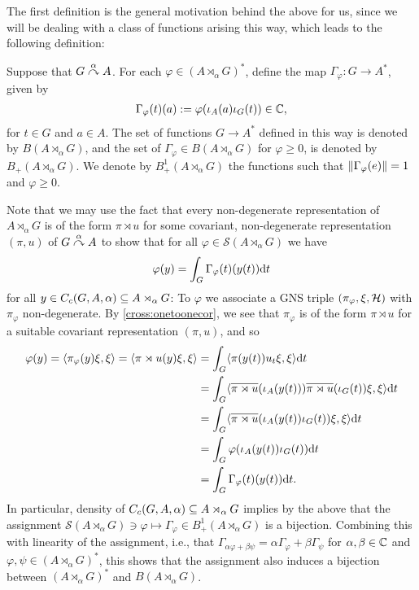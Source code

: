 The first definition is the general motivation behind the above for us, since we will be dealing with a class of functions arising this way, which leads to the following definition:
\begin{definition}
	Suppose that $G \stackrel{\alpha}{\curvearrowright} A$. For each $\varphi \in (A \rtimes_\alpha G)^*$, define the map $\Gamma_\varphi \colon G \to A^*$, given by
	\begin{align*}
		\Gamma_\varphi(t)(a) :=\varphi(\iota_A(a) \iota_G(t)) \in \mathbb{C},
	\end{align*}
	for $t \in G $ and $a \in A$. The set of functions $G \to A^*$ defined in this way is denoted by $B(A \rtimes_ \alpha G)$, and the set of $\Gamma_\varphi \in B(A \rtimes_ \alpha G)$ for $\varphi \geq 0$,  is denoted by $B_+(A \rtimes_\alpha G)$. We denote by $B_+^1(A \rtimes_\alpha G)$ the functions such that $\left\lVert \Gamma_\varphi (e) \right\rVert = 1$ and $\varphi \geq 0$. 
\end{definition}
\begin{remark}
	Note that we may use the fact that every non-degenerate representation of $A \rtimes_\alpha G$ is of the form $\pi \rtimes u$ for some covariant, non-degenerate representation $(\pi,u)$ of $G \stackrel{\alpha}{\curvearrowright} A$ to show that for all $\varphi \in \mathcal{S}(A \rtimes_\alpha G)$ we have
	\begin{align}
		\varphi(y) = \int_G \Gamma_\varphi(t)(y(t)) \mathrm{d} t
		\label{eq:gammafun}
	\end{align}
	for all $y \in C_c(G,A,\alpha) \subseteq A \rtimes_\alpha G$: To $\varphi$ we associate a GNS triple $(\pi_\varphi,\xi, \mathcal{H})$ with $\pi_{\varphi}$ non-degenerate. By \cref{cross:onetoonecor}, we see that $\pi_\varphi$ is of the form $\pi \rtimes u$ for a suitable covariant representation $(\pi,u)$, and so
	\begin{align*}
	\varphi(y) = \langle \pi_\varphi(y) \xi, \xi \rangle = \langle \pi \rtimes u(y) \xi, \xi\rangle &= \int_G \langle \pi(y(t)) u_t \xi, \xi \rangle \mathrm{d} t\\
	&= \int_G \langle \overline{\pi \rtimes u }(\iota_A(y(t))) \overline{\pi \rtimes u } (\iota_G(t)) \xi , \xi \rangle \mathrm{d} t\\
	&= \int_G \langle \overline{\pi \rtimes u} (\iota_A(y(t)) \iota_G(t)) \xi , \xi \rangle\mathrm{d} t\\
	&= \int_G \varphi(\iota_A(y(t)) \iota_G(t)) \mathrm{d} t \\
	&= \int_G \Gamma_\varphi (t) (y(t)) \mathrm{d} t.
	\end{align*}
	In particular, density of $C_c(G, A,\alpha) \subseteq A \rtimes_\alpha G$ implies by the above that the assignment $\mathcal{S}(A \rtimes_\alpha G) \ni \varphi \mapsto \Gamma_\varphi \in B_+^1(A \rtimes_\alpha G)$ is a bijection. Combining this with linearity of the assignment, i.e., that $\Gamma_{\alpha \varphi + \beta \psi}= \alpha \Gamma_\varphi + \beta \Gamma_\psi$ for $\alpha, \beta \in \mathbb{C}$ and $\varphi, \psi \in (A \rtimes_\alpha G)^*$, this shows that the assignment also induces a bijection between $(A \rtimes_\alpha G )^*$ and $B(A \rtimes_\alpha G)$.
\end{remark}

